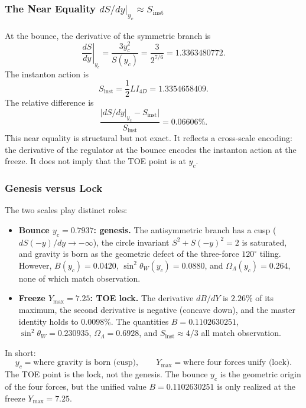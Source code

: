 \documentclass[a4paper,1pt,oneside,openany]{book}
\begin{document}
\subsubsection{The Near Equality $dS/dy|_{y_c} \approx S_{\mathrm{inst}}$}

At the bounce, the derivative of the symmetric branch is
\begin{equation}
\left.\frac{dS}{dy}\right|_{y_c} = \frac{3y_c^2}{S(y_c)} = \frac{3}{2^{7/6}} = 1.3363480772.
\label{eq:dSdy-yc}
\end{equation}
The instanton action is
\begin{equation}
S_{\mathrm{inst}} = \frac{1}{2}LI_{4D} = 1.3354658409.
\label{eq:Sinst-value}
\end{equation}
The relative difference is
\begin{equation}
\frac{|dS/dy|_{y_c} - S_{\mathrm{inst}}|}{S_{\mathrm{inst}}} = 0.06606\%.
\label{eq:near-eq-error}
\end{equation}
This near equality is structural but not exact. It reflects a cross-scale encoding: the derivative of the regulator at the bounce encodes the instanton action at the freeze. It does not imply that the TOE point is at $y_c$.

\subsubsection{Genesis versus Lock}

The two scales play distinct roles:
\begin{itemize}
\item \textbf{Bounce $y_c = 0.7937$: genesis.} The antisymmetric branch has a cusp ($dS(-y)/dy \to -\infty$), the circle invariant $S^2 + S(-y)^2 = 2$ is saturated, and gravity is born as the geometric defect of the three-force $120^\circ$ tiling. However, $B(y_c) = 0.0420$, $\sin^2\theta_W(y_c) = 0.0880$, and $\Omega_\Lambda(y_c) = 0.264$, none of which match observation.
\item \textbf{Freeze $Y_{\max} = 7.25$: TOE lock.} The derivative $dB/dY$ is $2.26\%$ of its maximum, the second derivative is negative (concave down), and the master identity holds to $0.0098\%$. The quantities $B = 0.1102630251$, $\sin^2\theta_W = 0.230935$, $\Omega_\Lambda = 0.6928$, and $S_{\mathrm{inst}} \approx 4/3$ all match observation.
\end{itemize}
In short:
\begin{equation}
\boxed{y_c = \text{where gravity is born (cusp)}, \qquad Y_{\max} = \text{where four forces unify (lock)}.}
\label{eq:genesis-lock}
\end{equation}
The TOE point is the lock, not the genesis. The bounce $y_c$ is the geometric origin of the four forces, but the unified value $B = 0.1102630251$ is only realized at the freeze $Y_{\max} = 7.25$.
\end{document}
